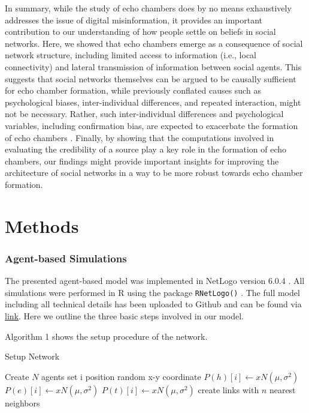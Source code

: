 \documentclass[doc,floatsintext]{apa6}
\begin{document}
In summary, while the study of echo chambers does by no means exhaustively addresses the issue of digital misinformation, it provides an important contribution to our understanding of how people settle on beliefs in social networks. Here, we showed that echo chambers emerge as a consequence of social network structure, including limited access to information (i.e., local connectivity) and lateral transmission of information between social agents. This suggests that social networks themselves can be argued to be causally sufficient for echo chamber formation, while previously conflated causes such as psychological biases, inter-individual differences, and repeated interaction, might not be necessary. Rather, such inter-individual differences and psychological variables, including confirmation bias, are expected to exacerbate the formation of echo chambers \citep{pilditch2017opinion}. Finally, by showing that the computations involved in evaluating the credibility of a source play a key role in the formation of echo chambers, our findings might provide important insights for improving the architecture of social networks in a way to be more robust towards echo chamber formation.


\section{Methods}

\subsubsection{Agent-based Simulations}
The presented agent-based model was implemented in NetLogo version 6.0.4 \citep{wilensky1999netlogo}. All simulations were performed in R using the package {\tt RNetLogo()} \citep{thiele2014r}. The full model including all technical details has been uploaded to Github and can be found via \href{}{ link}. Here we outline the three basic steps involved in our model. 

Algorithm 1 shows the setup procedure of the network.


\begin{algorithm}[H]
\caption{Setup Network}\label{setup}
\begin{algorithmic}[1]
    \State Create $N$ agents
        \State set i position random x-y coordinate
     \EndFor
  \EndProcedure
      \State $P(h)[i]\gets x$\thicksim$N(\mu, \sigma^2)$ 
      \State $P(e)[i]\gets x$\thicksim$N(\mu, \sigma^2)$
      \State $P(t)[i]\gets x$\thicksim$N(\mu, \sigma^2)$
      \State create links with $n$ nearest neighbors 
     \EndFor
  \EndProcedure
\end{algorithmic}
\end{algorithm}
\end{document}
